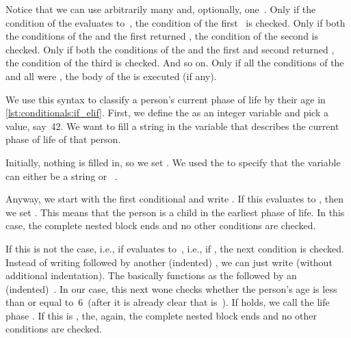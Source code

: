 %
Notice that we can use arbitrarily many  and, optionally, one~.
Only if the condition of the  evaluates to~, the condition of the first~ is checked.
Only if both the conditions of the  and the first  returned , the condition of the second  is checked.
Only if both the conditions of the  and the first and second  returned , the condition of the third  is checked.
And so on.
Only if all the conditions of the  and all  were , the body of the  is executed (if any).

We use this syntax to classify a person's current phase of life by their age in \cref{lst:conditionals:if_elif}.
First, we define the  as an integer variable and pick a value, say~42.
We want to fill a string in the variable  that describes the current phase of life of that person.

Initially, nothing is filled in, so we set .
We used the   to specify that the variable can either be a string or ~\cite{PEP604}.

Anyway, we start with the first conditional and write .
If this evaluates to , then we set .
This means that the person is a child in the earliest phase of life.
In this case, the complete nested  block ends and no other conditions are checked.

If this is not the case, i.e., if  evaluates to~, i.e., if , the next condition is checked.
Instead of writing  followed by another (indented) , we can just write  (without additional indentation).
The  basically functions as the  followed by an (indented)~.
In our case, this next wone checks whether the person's age is less than or equal to~6~(after it is already clear that  is~).
If  holds, we call the life phase .
If this is , the, again, the complete nested  block ends and no other conditions are checked.

